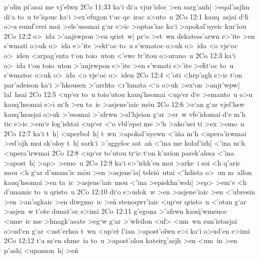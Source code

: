 p'olin
pi'asai
me
vj'elwn\bibvsend
\vs 2Co 11:33
ka`i
di`a
vjur'idoc
>en
sarg'anh|
>eqal'asjhn
di`a
to~u
te'iqouc
ka`i
>ex'efugon
t`ac
qe~irac
a>uto~u\bibvsend
\vs 2Co 12:1
kauq~asjai
d`h\r{}
o>u
sumf'erei
moi
>ele'usomai
g`ar
e>ic
>optas'iac
ka`i
>apokal'uyeic
kur'iou\bibvsend
\vs 2Co 12:2
o>~ida
>'anjrwpon
>en
qrist~w|
pr`o
>et~wn
dekatess'arwn
e>'ite
>en
s'wmati
o>uk
o>~ida
e>'ite
>ekt`oc
to~u
s'wmatoc
o>uk
o>~ida
<o
vje`oc
o>~iden
<arpag'enta
t`on
toio~uton
<'ewc
tr'itou
o>urano~u\bibvsend
\vs 2Co 12:3
ka`i
o>~ida
t`on
toio~uton
>'anjrwpon
e>'ite
>en
s'wmati
e>'ite
>e\r{k}t`oc
to~u
s'wmatoc
o>uk
o>~ida
<o
vje`oc
o>~iden\bibvsend
\vs 2Co 12:4
<'oti
<hrp'agh
e>ic
t`on
par'adeison
ka`i
>'hkousen
>'arrhta
<r'hmata
<`a
o>uk
>ex`on
>anjr'wpw|
lal~hsai\bibvsend
\vs 2Co 12:5
<up`er
to~u
toio'utou
kauq'hsomai
<up`er
d`e
>emauto~u
o>u
kauq'hsomai
e>i
m`h
>en
ta~ic
>asjene'iaic
m\r{o}u\bibvsend
{}
\vs 2Co 12:6
>e`an
g`ar
vjel'hsw
kauq'hsasjai
o>uk
>'esomai
>'afrwn
>al'hjeian
g`ar
>er~w
vfe'idomai
d`e
m'h
tic
e>ic
>em`e
log'ishtai
<up`er
<`o
vbl'epei
me
>`h
>ako'uei
ti
>ex
>emo~u\bibvsend
\vs 2Co 12:7
ka`i
t~h|
<uperbol~h|
t~wn
>apokal'uyewn
<'i\r{n}a
m`h
<upera'irwmai
>ed'ojh
moi
sk'oloy
t~h|
sark`i
>'aggeloc
sat~a\r{n}
<'ina
me
kolaf'izh|
<'ina
m`h
<upera'irwmai\bibvsend
\vs 2Co 12:8
<up`er
to'utou
tr`ic
t`on
k'urion
parek'alesa
<'ina
>apost~h|
>ap>
>emo~u\bibvsend
\vs 2Co 12:9
ka`i
e>'irhk'en
moi
>arke~i
soi
<h
q'aric
mou
<h
g`ar
d'unam'ic
m\r{o}u
>en
>asjene'ia|
telei\r{o}~utai
<'hdista
o>~un
m~allon
kauq'hsomai
>en
ta~ic
>asjene'iaic
mou
<'ina
>episkhn'wsh|
>ep>
>em`e
<h
d'unamic
to~u
qristo~u\bibvsend
\vs 2Co 12:10
di`o
e>udok~w
>en
>asjene'iaic
>en
<'ubresin
>en
>an'agkaic
>en
diwgmo~ic
>e\r{n}
stenoqwr'iaic
<up`er
qristo~u
<'otan
g`ar
>asjen~w
t'ote
dunat'oc
e>imi\bibvsend
\vs 2Co 12:11
g'egona
>'afrwn
kau\r{q}'wmenoc
<ume~ic
me
>hnagk'asate
>eg`w
g`ar
>'wfeilon
<uf>
<um~wn
sun'istasjai
o>ud`en
g`ar
<ust'erhsa
t~wn
<up`er\r{}
l'ian
>apost'olwn
e>i
ka`i
o>ud'en
e>imi\bibvsend
\vs 2Co 12:12
t`a
m`en
shme~ia
to~u
>apost'olou
kateirg'asjh
>en
<um~in
>en
p'ash|
<upomon~h|
>en\r{}

